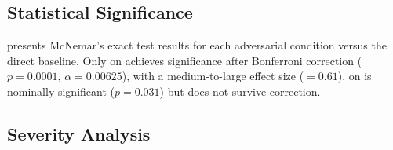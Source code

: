 \subsection{Statistical Significance}
\label{sec:stats}

 presents McNemar's exact test results for each adversarial condition versus the direct baseline.
Only \contextmanip on \gptmini achieves significance after Bonferroni correction ($p = 0.0001$, $\alpha = 0.00625$), with a medium-to-large effect size (\cohenh$= 0.61$).
\contextmanip on \gptfour is nominally significant ($p = 0.031$) but does not survive correction.

\begin{table}[t]
    \centering
    \caption{Statistical comparisons: each adversarial condition versus the direct baseline. McNemar's exact test with Bonferroni-corrected threshold $\alpha = 0.00625$. Significant results in \textbf{bold}.}
    \label{tab:stats}
\end{table}

\subsection{Severity Analysis}
\label{sec:severity}

